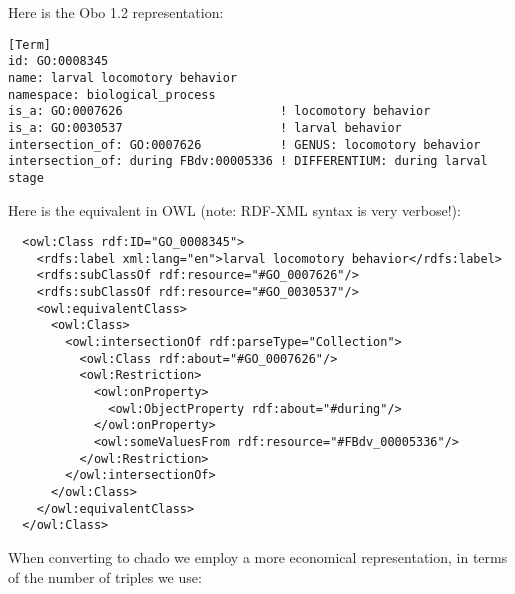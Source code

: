 Here is the Obo 1.2 representation:

\begin{verbatim}
[Term]
id: GO:0008345
name: larval locomotory behavior
namespace: biological_process
is_a: GO:0007626                      ! locomotory behavior
is_a: GO:0030537                      ! larval behavior
intersection_of: GO:0007626           ! GENUS: locomotory behavior
intersection_of: during FBdv:00005336 ! DIFFERENTIUM: during larval stage
\end{verbatim}

Here is the equivalent in OWL (note: RDF-XML syntax is very verbose!):

\begin{verbatim}
  <owl:Class rdf:ID="GO_0008345">
    <rdfs:label xml:lang="en">larval locomotory behavior</rdfs:label>
    <rdfs:subClassOf rdf:resource="#GO_0007626"/>
    <rdfs:subClassOf rdf:resource="#GO_0030537"/>
    <owl:equivalentClass>
      <owl:Class>
        <owl:intersectionOf rdf:parseType="Collection">
          <owl:Class rdf:about="#GO_0007626"/>
          <owl:Restriction>
            <owl:onProperty>
              <owl:ObjectProperty rdf:about="#during"/>
            </owl:onProperty>
            <owl:someValuesFrom rdf:resource="#FBdv_00005336"/>
          </owl:Restriction>
        </owl:intersectionOf>
      </owl:Class>
    </owl:equivalentClass>
  </owl:Class>
\end{verbatim}

When converting to chado we employ a more economical representation,
in terms of the number of triples we use:

